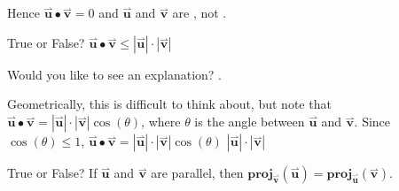 \documentclass{ximera}
\begin{document}
\begin{exercise}
\begin{selectAll}
\begin{hint}
\begin{problem}
\begin{question}
\begin{itemize}
Hence $\overset{\boldsymbol{\rightharpoonup}}{\mathbf{u}} \bullet \overset{\boldsymbol{\rightharpoonup}}{\mathbf{v}} = 0$ and $\overset{\boldsymbol{\rightharpoonup}}{\mathbf{u}}$ and $\overset{\boldsymbol{\rightharpoonup}}{\mathbf{v}}$ are , not .
\end{itemize}
\end{question}
\end{problem}
\begin{problem}
True or False?  $\overset{\boldsymbol{\rightharpoonup}}{\mathbf{u}} \bullet \overset{\boldsymbol{\rightharpoonup}}{\mathbf{v}} \leq |\overset{\boldsymbol{\rightharpoonup}}{\mathbf{u}}| \cdot |\overset{\boldsymbol{\rightharpoonup}}{\mathbf{v}}|$

Would you like to see an explanation?
.

\begin{question}
\begin{itemize}
Geometrically, this is difficult to think about, but note that $\overset{\boldsymbol{\rightharpoonup}}{\mathbf{u}} \bullet \overset{\boldsymbol{\rightharpoonup}}{\mathbf{v}} =  |\overset{\boldsymbol{\rightharpoonup}}{\mathbf{u}}| \cdot |\overset{\boldsymbol{\rightharpoonup}}{\mathbf{v}}| \cos(\theta)$, where $\theta$ is the angle between $\overset{\boldsymbol{\rightharpoonup}}{\mathbf{u}}$ and $\overset{\boldsymbol{\rightharpoonup}}{\mathbf{v}}$.  Since $\cos(\theta) \leq 1$, $\overset{\boldsymbol{\rightharpoonup}}{\mathbf{u}} \bullet \overset{\boldsymbol{\rightharpoonup}}{\mathbf{v}} =  |\overset{\boldsymbol{\rightharpoonup}}{\mathbf{u}}| \cdot |\overset{\boldsymbol{\rightharpoonup}}{\mathbf{v}}| \cos(\theta)$ \wordChoice{\choice[correct]{$\leq$}\choice{$\geq$}} $|\overset{\boldsymbol{\rightharpoonup}}{\mathbf{u}}| \cdot |\overset{\boldsymbol{\rightharpoonup}}{\mathbf{v}}|$
\end{itemize}
\end{question}
\end{problem}

\begin{problem}
True or False?  If $\overset{\boldsymbol{\rightharpoonup}}{\mathbf{u}}$ and $\overset{\boldsymbol{\rightharpoonup}}{\mathbf{v}}$ are parallel, then $\mathbf{proj}_{\overset{\boldsymbol{\rightharpoonup}}{\mathbf{v}}}(\overset{\boldsymbol{\rightharpoonup}}{\mathbf{u}}) = \mathbf{proj}_{\overset{\boldsymbol{\rightharpoonup}}{\mathbf{u}}}(\overset{\boldsymbol{\rightharpoonup}}{\mathbf{v}})$.


\end{problem}
\end{hint}
\end{selectAll}
\end{exercise}
\end{document}
